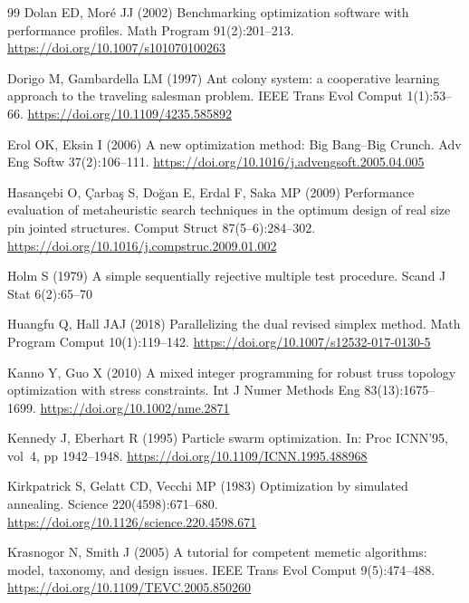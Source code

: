 \documentclass[lineno,pdflatex,sn-mathphys-num]{sn-jnl}
\begin{document}
\begin{thebibliography}{99}
Dolan ED, Mor\'e JJ (2002) Benchmarking optimization software with performance profiles. Math Program 91(2):201--213. \url{https://doi.org/10.1007/s101070100263}

Dorigo M, Gambardella LM (1997) Ant colony system: a cooperative learning approach to the traveling salesman problem. IEEE Trans Evol Comput 1(1):53--66. \url{https://doi.org/10.1109/4235.585892}

Erol OK, Eksin I (2006) A new optimization method: Big Bang--Big Crunch. Adv Eng Softw 37(2):106--111. \url{https://doi.org/10.1016/j.advengsoft.2005.04.005}

Hasan\c{c}ebi O, \c{C}arba\c{s} S, Do\u{g}an E, Erdal F, Saka MP (2009) Performance evaluation of metaheuristic search techniques in the optimum design of real size pin jointed structures. Comput Struct 87(5--6):284--302. \url{https://doi.org/10.1016/j.compstruc.2009.01.002}

Holm S (1979) A simple sequentially rejective multiple test procedure. Scand J Stat 6(2):65--70

Huangfu Q, Hall JAJ (2018) Parallelizing the dual revised simplex method. Math Program Comput 10(1):119--142. \url{https://doi.org/10.1007/s12532-017-0130-5}

Kanno Y, Guo X (2010) A mixed integer programming for robust truss topology optimization with stress constraints. Int J Numer Methods Eng 83(13):1675--1699. \url{https://doi.org/10.1002/nme.2871}

Kennedy J, Eberhart R (1995) Particle swarm optimization. In: Proc ICNN'95, vol~4, pp 1942--1948. \url{https://doi.org/10.1109/ICNN.1995.488968}

Kirkpatrick S, Gelatt CD, Vecchi MP (1983) Optimization by simulated annealing. Science 220(4598):671--680. \url{https://doi.org/10.1126/science.220.4598.671}

Krasnogor N, Smith J (2005) A tutorial for competent memetic algorithms: model, taxonomy, and design issues. IEEE Trans Evol Comput 9(5):474--488. \url{https://doi.org/10.1109/TEVC.2005.850260}


\end{thebibliography}
\end{document}
